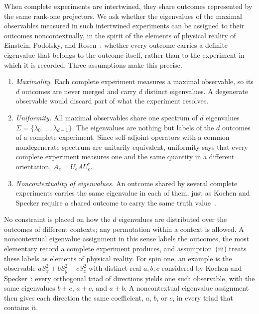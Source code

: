 \documentclass[aps,pra,reprint,superscriptaddress,longbibliography,nofootinbib,floatfix,10pt]{revtex4-2}
\theoremstyle{definition}\newtheorem{definition}[theorem]{Definition}
\theoremstyle{remark}\newtheorem{remark}[theorem]{Remark}
\begin{document}
When complete experiments are intertwined, they share outcomes represented by the same rank-one projectors. We ask whether the eigenvalues of the maximal observables measured in such intertwined experiments can be assigned to their outcomes noncontextually, in the spirit of the elements of physical reality of Einstein, Podolsky, and Rosen~\cite{epr}: whether every outcome carries a definite eigenvalue that belongs to the outcome itself, rather than to the experiment in which it is recorded. Three assumptions make this precise.
\begin{enumerate}
\item[(i)] \emph{Maximality.} Each complete experiment measures a maximal observable, so its $d$ outcomes are never merged and carry $d$ distinct eigenvalues. A degenerate observable would discard part of what the experiment resolves.
\item[(ii)] \emph{Uniformity.} All maximal observables share one spectrum of $d$ eigenvalues $\Sigma=\{\lambda_0,\ldots,\lambda_{d-1}\}$. The eigenvalues are nothing but labels of the $d$ outcomes of a complete experiment. Since self-adjoint operators with a common nondegenerate spectrum are unitarily equivalent, uniformity says that every complete experiment measures one and the same quantity in a different orientation, $A_e=U_eAU_e^\dagger$.
\item[(iii)] \emph{Noncontextuality of eigenvalues.} An outcome shared by several complete experiments carries the same eigenvalue in each of them, just as Kochen and Specker require a shared outcome to carry the same truth value~\cite{kochen1}.
\end{enumerate}
No constraint is placed on how the $d$ eigenvalues are distributed over the outcomes of different contexts; any permutation within a context is allowed. A noncontextual eigenvalue assignment in this sense labels the outcomes, the most elementary record a complete experiment produces, and assumption~(iii) treats these labels as elements of physical reality. For spin one, an example is the observable $aS_x^2+bS_y^2+cS_z^2$ with distinct real $a,b,c$ considered by Kochen and Specker~\cite{kochen1}: every orthogonal triad of directions yields one such observable, with the same eigenvalues $b+c$, $a+c$, and $a+b$. A noncontextual eigenvalue assignment then gives each direction the same coefficient, $a$, $b$, or $c$, in every triad that contains it.
\end{document}
